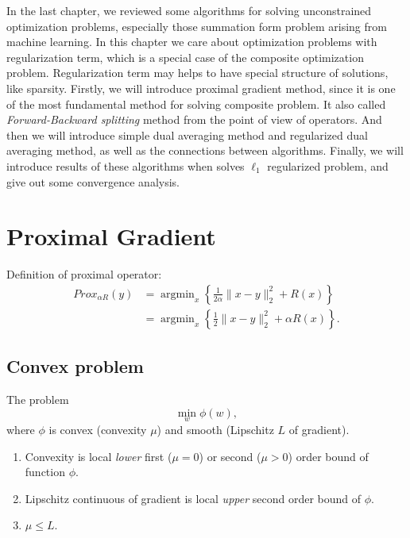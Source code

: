 
In the last chapter, we reviewed some algorithms for solving unconstrained optimization problems, especially those summation form problem arising from machine learning.
In this chapter we care about optimization problems with regularization term, which is a special case of the composite optimization problem.
Regularization term may helps to have special structure of solutions, like sparsity.
Firstly, we will introduce proximal gradient method, since it is one of the most fundamental method for solving composite problem.
It also called \emph{Forward-Backward splitting} method from the point of view of operators.
And then we will introduce simple dual averaging method and regularized dual averaging method, as well as the connections between algorithms.
Finally, we will introduce results of these algorithms when solves $\ell_1$ regularized problem, and give out some convergence analysis.


\section{Proximal Gradient}
Definition of proximal operator:
\begin{equation}
	\begin{split}
		Prox_{\alpha R} (y)
		& =\mathop{\arg \min}_x \left\lbrace \frac{1}{2\alpha} \|x-y\|^2_2+R(x) \right \rbrace\\
		& =\mathop{\arg \min}_x \left\lbrace \frac{1}{2} \|x-y\|^2_2+\alpha R(x) \right \rbrace.
	\end{split}
\end{equation}

\subsection{Convex problem}
The problem
\begin{equation}
	\min_w \phi(w),
\end{equation}
where $\phi$ is convex (convexity $\mu$) and smooth (Lipschitz $L$ of gradient).
\begin{enumerate}
	\item Convexity is local \emph{lower} first ($\mu=0$) or second ($\mu>0$) order bound of function $\phi$.
	\item Lipschitz continuous of gradient is local \emph{upper} second order bound of $\phi$.
	\item $\mu \leq L$.
\end{enumerate}

